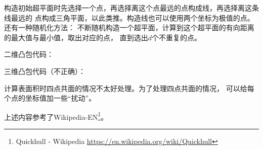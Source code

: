 构造初始超平面时先选择一个点，再选择离这个点最远的点构成线，再选择离这条线最远的
点构成三角平面，以此类推。构造线也可以使用两个坐标为极值的点。还有一种随机化方法：
不断随机构造一个超平面，计算到这个超平面的有向距离的最大值与最小值，取出对应的点，
直到选出$d$个不重复的点。

二维凸包代码：

三维凸包代码（不正确）：

计算表面积时四点共面的情况不太好处理。为了处理四点共面的情况，
可以给每个点的坐标值加一些``扰动''。


上述内容参考了Wikipedia-EN\footnote{
    Quickhull - Wikipedia
    \url{https://en.wikipedia.org/wiki/Quickhull}
}。
